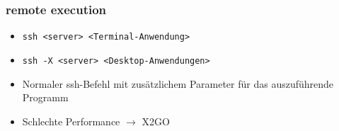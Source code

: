 \begin{frame}
\frametitle{remote execution}
\begin{itemize}
	\item \texttt{ssh <server> <Terminal-Anwendung>}
	\pause
	\item \texttt{ssh -X <server> <Desktop-Anwendungen>}
	\pause
	\item Normaler ssh-Befehl mit zusätzlichem Parameter für das auszuführende Programm
	\pause
	\item Schlechte Performance $\rightarrow$ X2GO
\end{itemize}
\end{frame}